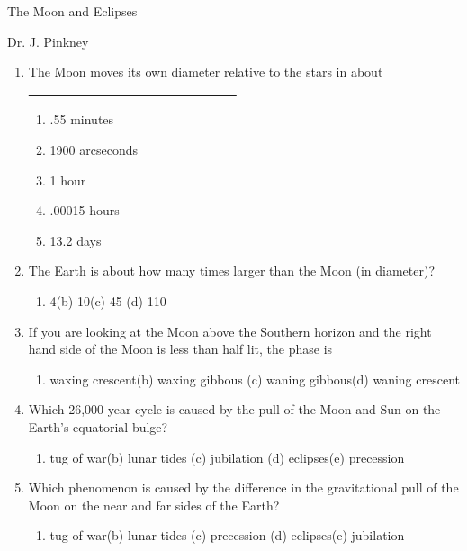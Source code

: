 \documentclass[12pt,thmsa]{article}
\begin{document}
\begin{center}
{\huge The Moon and Eclipses }

{\Large Dr. J. Pinkney}

\end{center}

\begin{enumerate}

\item The Moon moves its own diameter relative
to the stars in about \underline{~~~~~~~~~~~~~~~~~~~~~~~~~~~~~~~~~}
\begin{enumerate}
\item .55 minutes
\item 1900 arcseconds
\item 1 hour
\item .00015 hours
\item 13.2 days
\end{enumerate}

\item  The Earth is about how many times larger than the Moon (in diameter)?

\begin{enumerate}
\item  4\qquad (b) 10\qquad (c) 45 \qquad (d) 110
\end{enumerate}

\item  If you are looking at the Moon above the Southern horizon and the
right hand side of the Moon is less than half lit, the phase is

\begin{enumerate}
\item  waxing crescent\qquad (b) waxing gibbous \qquad (c) waning
gibbous\qquad (d) waning crescent
\end{enumerate}

\item  Which 26,000 year cycle is caused by the pull of the Moon and Sun 
on the Earth's equatorial bulge?
\begin{enumerate}
\item tug of war\qquad (b) lunar tides \qquad (c) jubilation \qquad (d)
eclipses\qquad (e) precession
\end{enumerate}

\item  Which phenomenon is caused by the difference in the gravitational
pull of the Moon on the near and far sides of the Earth?
\begin{enumerate}
\item  tug of war\qquad (b) lunar tides \qquad (c) precession \qquad (d)
eclipses\qquad (e) jubilation
\end{enumerate}


\end{enumerate}
\end{document}
